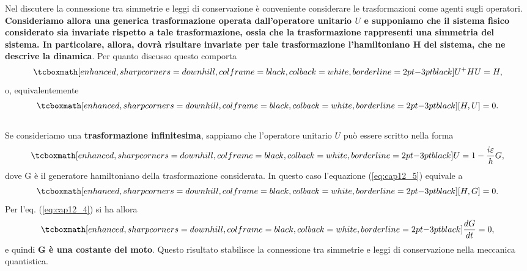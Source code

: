 \documentclass[a4paper,12pt,oneside]{book}
\begin{document}
Nel discutere la connessione tra simmetrie e leggi di conservazione è conveniente considerare le trasformazioni come agenti sugli operatori. \textbf{Consideriamo allora una generica trasformazione operata dall'operatore unitario ${U}$ e supponiamo che il sistema fisico considerato sia invariate rispetto a tale trasformazione, ossia che la trasformazione rappresenti una simmetria del sistema. In particolare, allora, dovrà risultare invariate per tale trasformazione l'hamiltoniano H del sistema, che ne descrive la dinamica}. Per quanto discusso questo comporta
	\begin{equation}
		\tcboxmath[enhanced, sharp corners=downhill, colframe=black, colback=white, borderline={2pt}{-3pt}{black}]{
			{U}^+H{U}= H,
			}
	\end{equation}
o, equivalentemente 
	\begin{equation}
	\label{eq:cap12_5}
		\tcboxmath[enhanced, sharp corners=downhill, colframe=black, colback=white, borderline={2pt}{-3pt}{black}]{
			[H,{U}]=0.
			}
	\end{equation}\\

Se consideriamo una \textbf{trasformazione infinitesima}, sappiamo che l'operatore unitario ${U}$ può essere scritto nella forma 
	\begin{equation}
		\tcboxmath[enhanced, sharp corners=downhill, colframe=black, colback=white, borderline={2pt}{-3pt}{black}]{
			{U}= 1- \frac{i\varepsilon}{\hbar}G,
			}
	\end{equation}
dove G è il generatore hamiltoniano della trasformazione considerata. In questo caso l'equazione (\ref{eq:cap12_5}) equivale a 
	\begin{equation} 
		\tcboxmath[enhanced, sharp corners=downhill, colframe=black, colback=white, borderline={2pt}{-3pt}{black}]{
			[H,G]=0.
			}
	\end{equation}
Per l'eq. (\ref{eq:cap12_4}) si ha allora
	\begin{equation}
		\tcboxmath[enhanced, sharp corners=downhill, colframe=black, colback=white, borderline={2pt}{-3pt}{black}]{
			\frac{dG}{dt}=0,
			}
	\end{equation}
e quindi \textbf{G è una costante del moto}. Questo risultato stabilisce la connessione tra simmetrie e leggi di conservazione nella meccanica quantistica.\\
\end{document}
